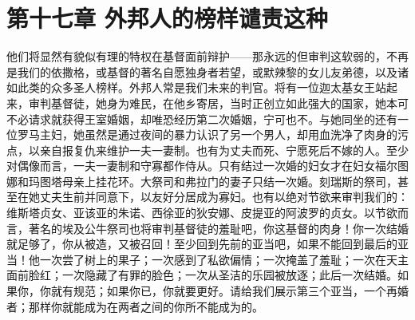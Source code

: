 
\section{第十七章 外邦人的榜样谴责这种}

他们将显然有貌似有理的特权在基督面前辩护——那永远的但审判这软弱的，不再是我们的依撒格，或基督的著名自愿独身者若望，或默辣黎的女儿友弟德，以及诸如此类的众多圣人榜样。外邦人常是我们未来的判官。将有一位迦太基女王站起来，审判基督徒，她身为难民，在他乡寄居，当时正创立如此强大的国家，她本可不必请求就获得王室婚姻，却唯恐经历第二次婚姻，宁可也不。与她同坐的还有一位罗马主妇，她虽然是通过夜间的暴力认识了另一个男人，却用血洗净了肉身的污点，以亲自报复仇来维护一夫一妻制。也有为丈夫而死、宁愿死后不嫁的人。至少对偶像而言，一夫一妻制和守寡都作侍从。只有结过一次婚的妇女才在妇女福尔图娜和玛图塔母亲上挂花环。大祭司和弗拉门的妻子只结一次婚。刻瑞斯的祭司，甚至在她丈夫生前并同意下，以友好分居成为寡妇。也有以绝对节欲来审判我们的：维斯塔贞女、亚该亚的朱诺、西徐亚的狄安娜、皮提亚的阿波罗的贞女。以节欲而言，著名的埃及公牛祭司也将审判基督徒的羞耻吧，你这基督的肉身！你一次结婚就足够了，你从被造，又被召回！至少回到先前的亚当吧，如果不能回到最后的亚当！他一次尝了树上的果子；一次感到了私欲偏情；一次掩盖了羞耻；一次在天主面前脸红；一次隐藏了有罪的脸色；一次从圣洁的乐园被放逐；此后一次结婚。如果你，你就有规范；如果你已，你就要更好。请给我们展示第三个亚当，一个再婚者；那样你就能成为在两者之间的你所不能成为的。\par

